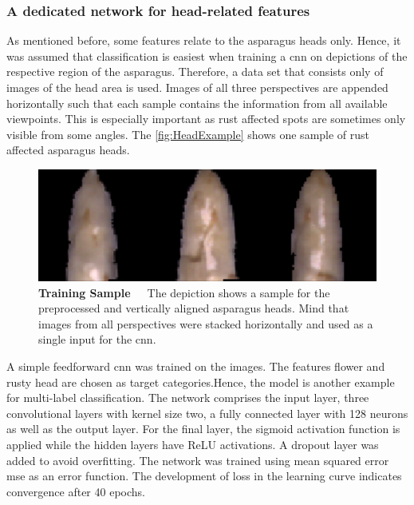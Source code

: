 \subsubsection{A dedicated network for head-related features}
\label{subsec:HeadNetwork}

As mentioned before, some features relate to the asparagus heads only. Hence, it was assumed that classification is easiest when training a \acrshort{cnn} on depictions of the respective region of the asparagus. Therefore, a data set that consists only of images of the head area is used. Images of all three perspectives are appended horizontally such that each sample contains the information from all available viewpoints. This is especially important as rust affected spots are sometimes only visible from some angles. The \autoref{fig:HeadExample} shows one sample of rust affected asparagus heads.

\begin{figure}[!htb]
	\centering
	\includegraphics[scale=0.4]{Figures/chapter04/head_example.png}
	\decoRule
	\caption[Head Features CNN Training Sample]{\textbf{Training Sample}~~~The depiction shows a sample for the preprocessed and vertically aligned asparagus heads. Mind that images from all perspectives were stacked horizontally and used as a single input for the \acrshort{cnn}.}
	\label{fig:HeadExample}
\end{figure}

A simple feedforward \acrshort{cnn} was trained on the images. The features flower and rusty head are chosen as target categories.Hence, the  model is another example for multi-label classification. The network comprises the input layer, three convolutional layers with kernel size two, a fully connected layer with 128 neurons as well as the output layer. For the final layer, the sigmoid activation function is applied while the hidden layers have ReLU activations. A dropout layer was added to avoid overfitting. The network was trained using mean squared error \acrshort{mse} as an error function. The development of loss in the learning curve indicates convergence after 40 epochs.


